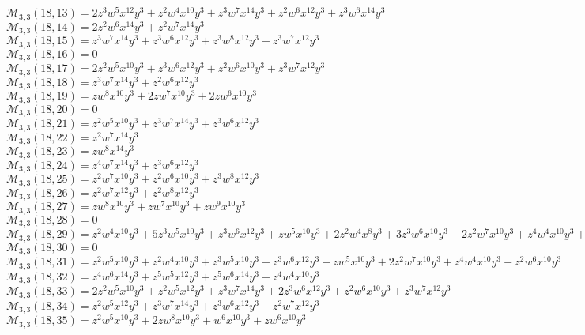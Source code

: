 \documentclass[12pt]{memoireuqam1.3}
\begin{document}
$\mathcal{M}_{3,3}(18,13)=2z^3w^5x^{12}y^3+z^2w^4x^{10}y^3+z^3w^7x^{14}y^3+z^2w^6x^{12}y^3+z^3w^6x^{14}y^3$\\
$\mathcal{M}_{3,3}(18,14)=2z^2w^6x^{14}y^3+z^2w^7x^{14}y^3$\\
$\mathcal{M}_{3,3}(18,15)=z^3w^7x^{14}y^3+z^3w^6x^{12}y^3+z^3w^8x^{12}y^3+z^3w^7x^{12}y^3$\\
$\mathcal{M}_{3,3}(18,16)=0$\\
$\mathcal{M}_{3,3}(18,17)=2z^2w^5x^{10}y^3+z^3w^6x^{12}y^3+z^2w^6x^{10}y^3+z^3w^7x^{12}y^3$\\
$\mathcal{M}_{3,3}(18,18)=z^3w^7x^{14}y^3+z^2w^6x^{12}y^3$\\
$\mathcal{M}_{3,3}(18,19)=zw^8x^{10}y^3+2zw^7x^{10}y^3+2zw^6x^{10}y^3$\\
$\mathcal{M}_{3,3}(18,20)=0$\\
$\mathcal{M}_{3,3}(18,21)=z^2w^5x^{10}y^3+z^3w^7x^{14}y^3+z^3w^6x^{12}y^3$\\
$\mathcal{M}_{3,3}(18,22)=z^2w^7x^{14}y^3$\\
$\mathcal{M}_{3,3}(18,23)=zw^8x^{14}y^3$\\
$\mathcal{M}_{3,3}(18,24)=z^4w^7x^{14}y^3+z^3w^6x^{12}y^3$\\
$\mathcal{M}_{3,3}(18,25)=z^2w^7x^{10}y^3+z^2w^6x^{10}y^3+z^3w^8x^{12}y^3$\\
$\mathcal{M}_{3,3}(18,26)=z^2w^7x^{12}y^3+z^2w^8x^{12}y^3$\\
$\mathcal{M}_{3,3}(18,27)=zw^8x^{10}y^3+zw^7x^{10}y^3+zw^9x^{10}y^3$\\
$\mathcal{M}_{3,3}(18,28)=0$\\
$\mathcal{M}_{3,3}(18,29)=z^2w^4x^{10}y^3+5z^3w^5x^{10}y^3+z^3w^6x^{12}y^3+zw^5x^{10}y^3+2z^2w^4x^8y^3+3z^3w^6x^{10}y^3+2z^2w^7x^{10}y^3+z^4w^4x^{10}y^3+z^2w^5x^8y^3$\\
$\mathcal{M}_{3,3}(18,30)=0$\\
$\mathcal{M}_{3,3}(18,31)=z^2w^5x^{10}y^3+z^2w^4x^{10}y^3+z^3w^5x^{10}y^3+z^3w^6x^{12}y^3+zw^5x^{10}y^3+2z^2w^7x^{10}y^3+z^4w^4x^{10}y^3+z^2w^6x^{10}y^3$\\
$\mathcal{M}_{3,3}(18,32)=z^4w^6x^{14}y^3+z^5w^5x^{12}y^3+z^5w^6x^{14}y^3+z^4w^4x^{10}y^3$\\
$\mathcal{M}_{3,3}(18,33)=2z^2w^5x^{10}y^3+z^2w^5x^{12}y^3+z^3w^7x^{14}y^3+2z^3w^6x^{12}y^3+z^2w^6x^{10}y^3+z^3w^7x^{12}y^3$\\
$\mathcal{M}_{3,3}(18,34)=z^2w^5x^{12}y^3+z^3w^7x^{14}y^3+z^3w^6x^{12}y^3+z^2w^7x^{12}y^3$\\
$\mathcal{M}_{3,3}(18,35)=z^2w^5x^{10}y^3+2zw^8x^{10}y^3+w^6x^{10}y^3+zw^6x^{10}y^3$\\
\end{document}
